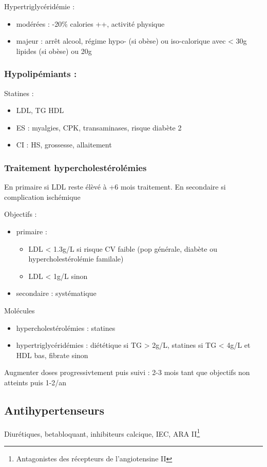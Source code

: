 \documentclass[11pt]{article}
\begin{document}
Hypertriglycéridémie : 
\begin{itemize}
\item modérées : -20\% calories ++, \inc activité physique
\item majeur : arrêt alcool, régime hypo- (si obèse) ou iso-calorique avec < 30g
lipides (si obèse) ou 20g
\end{itemize}

\subsubsection{Hypolipémiants :}
\label{sec:orgdc3550b}
Statines :
\begin{itemize}
\item \dec LDL, \dec TG \inc HDL
\item ES : myalgies, \inc CPK, \inc transaminases, \inc risque diabète 2
\item CI : HS, grossesse, allaitement
\end{itemize}
\subsubsection{Traitement hypercholestérolémies}
\label{sec:org877ea4c}
En primaire si LDL reste élèvé à +6 mois traitement. En secondaire si complication ischémique

Objectifs :
\begin{itemize}
\item primaire : 
\begin{itemize}
\item LDL < 1.3g/L si risque CV faible (pop générale, diabète ou hypercholestérolémie familale)
\item LDL < 1g/L sinon
\end{itemize}
\item secondaire : systématique
\end{itemize}

Molécules
\begin{itemize}
\item hypercholestérolémies : statines
\item hypertriglycéridémies : diététique si TG > 2g/L, statines si TG < 4g/L et HDL
bas, fibrate sinon
\end{itemize}

Augmenter doses progressivtement puis suivi : 2-3 mois tant que objectifs non
atteints puis 1-2/an

\subsection{Antihypertenseurs}
\label{sec:orgf5358f5}
Diurétiques, betabloquant, inhibiteurs calcique, IEC, ARA II\footnote{Antagonistes des récepteurs de l'angiotensine II}
\end{document}
